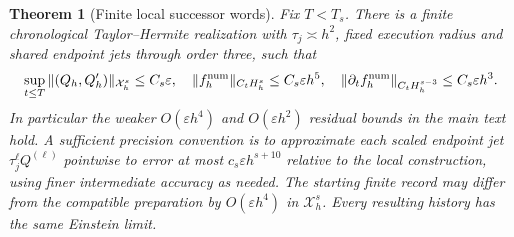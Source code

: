 \documentclass[11pt]{article}
\newtheorem{theorem}{Theorem}[section]
\numberwithin{equation}{section}
\theoremstyle{definition}
\theoremstyle{remark}
\begin{document}
\begin{theorem}[Finite local successor words]
\label{thm:supp-open-finite-words}
Fix $T<T_s$.  There is a finite chronological Taylor--Hermite realization
with $\tau_j\asymp h^2$, fixed execution radius and shared endpoint jets
through order three, such that
\begin{equation}
 \sup_{t\le T}\|(Q_h,Q_h')\|_{\mathcal X_h^s}\le C_s\varepsilon,
 \quad \|f_h^{\rm num}\|_{C_tH_h^s}\le C_s\varepsilon h^5,
 \quad \|\partial_tf_h^{\rm num}\|_{C_tH_h^{s-3}}
                         \le C_s\varepsilon h^3.
 \label{eq:supp-open-finite-defects}
\end{equation}
In particular the weaker $O(\varepsilon h^4)$ and
$O(\varepsilon h^2)$ residual bounds in the main text hold.
A sufficient precision convention is to approximate each scaled endpoint
jet $\tau_j^\ell Q^{(\ell)}$ pointwise to error at most
$c_s\varepsilon h^{s+10}$ relative to the local construction, using finer
intermediate accuracy as needed.  The starting finite record may differ
from the compatible preparation by $O(\varepsilon h^4)$ in
$\mathcal X_h^s$.  Every resulting history has the same Einstein limit.
\end{theorem}
\end{document}
